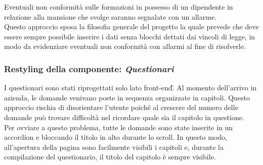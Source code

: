 Eventuali non conformità sulle formazioni in possesso di un dipendente in relazione alla mansione che svolge saranno segnalate con un allarme. \\
 Questo approccio sposa la filosofia generale del progetto la quale prevede che deve essere sempre possibile inserire i dati senza blocchi dettati dai vincoli di legge, in modo da evidenziare eventuali non conformità con allarmi al fine di risolverle.
\newpage
\subsubsection{Restyling della componente: \textit{Questionari}}
I questionari sono stati riprogettati solo lato \gls{front-end}\G.
Al momento dell'arrivo in azienda, le domande venivano poste in sequenza organizzate in capitoli. Questo approccio rischia di disorientare l'utente poiché al crescere del numero delle domande può trovare difficoltà nel ricordare quale sia il capitolo in questione. \\
Per ovviare a questo problema, tutte le domande sono state inserite  in un accordion e bloccando il titolo in alto durante lo scroll. In questo modo, all'apertura della pagina sono facilmente visibili i capitoli e, durante la compilazione del questionario, il titolo del capitolo è sempre visibile.\\

